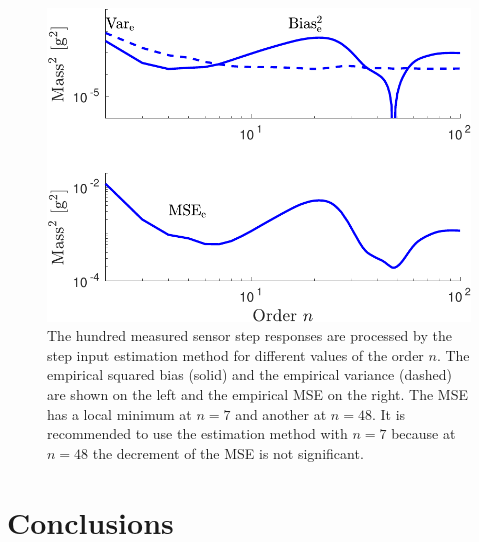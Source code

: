 \begin{figure}[!htbp]
\centering
\includegraphics[width=1.0\columnwidth]{./ChapterExperimentalValidation/fig/Fig_12.pdf} 
\caption{ \label{fig:msee_vs_n_exp} 
The hundred measured sensor step responses are processed by the step input estimation method for different values of the order $n$. 
The empirical squared bias (solid) and the empirical variance (dashed) are shown on the left and the empirical MSE on the right.
The MSE has a local minimum at $n=7$ and another at $n=48$.
It is recommended to use the estimation method with $n=7$ because at $n=48$ the decrement of the MSE is not significant.  }
\end{figure}

\section{Conclusions}

